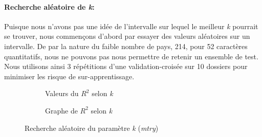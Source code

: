 	\paragraph{Recherche aléatoire de \textit{k}:} Puisque nous n'avons pas une idée de l'intervalle sur lequel le meilleur \textit{k} pourrait se trouver, nous commençons d'abord par essayer des valeurs aléatoires sur un intervalle. De par la nature du faible nombre de pays, 214, pour 52 caractères quantitatifs, nous ne pouvons pas nous permettre de retenir un ensemble de test. Nous utilisons ainsi 3 répétitions d'une validation-croisée sur 10 dossiers pour minimiser les risque de sur-apprentissage.
	\begin{figure}[H]
				\begin{subfigure}{.5\textwidth}
					\centering
					\caption{Valeurs du $R^2$ selon \textit{k} }
					\label{fig:mtry1}
				\end{subfigure}
				\begin{subfigure}{.5\textwidth}
						\centering
						\caption{Graphe de $R^2$ selon \textit{k}}
						\label{fig:mtry2}
				\end{subfigure}
				\caption{Recherche aléatoire du paramètre \textit{k} (\textit{mtry})}
				\label{fig:mtry}
					\end{figure}
